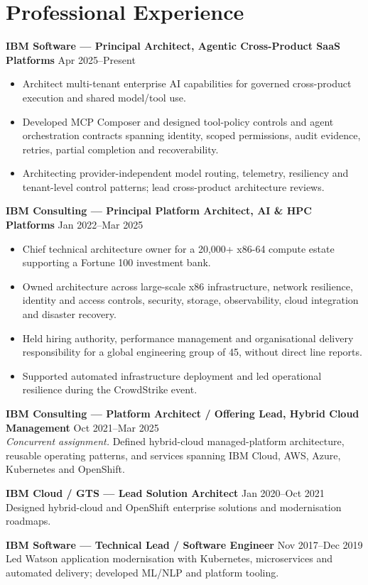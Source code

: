\documentclass[11pt,a4paper]{article}
\begin{document}
\section*{Professional Experience}
\textbf{IBM Software --- Principal Architect, Agentic Cross-Product SaaS Platforms} \hfill Apr 2025--Present
\begin{itemize}
\item Architect multi-tenant enterprise AI capabilities for governed cross-product execution and shared model/tool use.
\item Developed MCP Composer and designed tool-policy controls and agent orchestration contracts spanning identity, scoped permissions, audit evidence, retries, partial completion and recoverability.
\item Architecting provider-independent model routing, telemetry, resiliency and tenant-level control patterns; lead cross-product architecture reviews.
\end{itemize}
\textbf{IBM Consulting --- Principal Platform Architect, AI \& HPC Platforms} \hfill Jan 2022--Mar 2025
\begin{itemize}
\item Chief technical architecture owner for a 20,000+ x86-64 compute estate supporting a Fortune 100 investment bank.
\item Owned architecture across large-scale x86 infrastructure, network resilience, identity and access controls, security, storage, observability, cloud integration and disaster recovery.
\item Held hiring authority, performance management and organisational delivery responsibility for a global engineering group of 45, without direct line reports.
\item Supported automated infrastructure deployment and led operational resilience during the CrowdStrike event.
\end{itemize}
\textbf{IBM Consulting --- Platform Architect / Offering Lead, Hybrid Cloud Management} \hfill Oct 2021--Mar 2025\\
\emph{Concurrent assignment.} Defined hybrid-cloud managed-platform architecture, reusable operating patterns, and services spanning IBM Cloud, AWS, Azure, Kubernetes and OpenShift.

\textbf{IBM Cloud / GTS --- Lead Solution Architect} \hfill Jan 2020--Oct 2021\\
Designed hybrid-cloud and OpenShift enterprise solutions and modernisation roadmaps.

\textbf{IBM Software --- Technical Lead / Software Engineer} \hfill Nov 2017--Dec 2019\\
Led Watson application modernisation with Kubernetes, microservices and automated delivery; developed ML/NLP and platform tooling.
\end{document}
